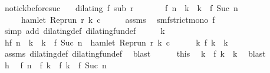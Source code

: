 \begin{isabellebody}
\ no{\isacharunderscore}tick{\isacharunderscore}before{\isacharunderscore}suc{\isacharcolon}\isanewline
\ \ \ {\isacartoucheopen}dilating\ f\ sub\ r{\isacartoucheclose}\isanewline
\ \ \ \ \ \ \ {\isacartoucheopen}{\isacharparenleft}f\ n{\isacharparenright}\ {\isacharless}\ k\ {\isasymand}\ k\ {\isacharless}\ {\isacharparenleft}f\ {\isacharparenleft}Suc\ n{\isacharparenright}{\isacharparenright}{\isacartoucheclose}\isanewline
\ \ \ \ \ {\isacartoucheopen}{\isasymnot}hamlet\ {\isacharparenleft}{\isacharparenleft}Rep{\isacharunderscore}run\ r{\isacharparenright}\ k\ c{\isacharparenright}{\isacartoucheclose}\isanewline
%
\isadelimproof
%
\endisadelimproof
%
\isatagproof
{}\isamarkupfalse%
\ {\isacharminus}\isanewline
\ \ \isamarkupfalse%
\ assms{\isacharparenleft}{}{\isacharparenright}\ \isamarkupfalse%
\ smf{\isacharcolon}{\isacartoucheopen}strict{\isacharunderscore}mono\ f{\isacartoucheclose}\ \isamarkupfalse%
\ {\isacharparenleft}simp\ add{\isacharcolon}\ dilating{\isacharunderscore}def\ dilating{\isacharunderscore}fun{\isacharunderscore}def{\isacharparenright}\isanewline
\ \ \isacommand{{\isacharbraceleft}}\isamarkupfalse%
\ \isamarkupfalse%
\ k\ \isamarkupfalse%
\ h{\isacharcolon}{\isacartoucheopen}f\ n\ {\isacharless}\ k\ {\isasymand}\ k\ {\isacharless}\ f\ {\isacharparenleft}Suc\ n{\isacharparenright}\ {\isasymand}\ hamlet\ {\isacharparenleft}{\isacharparenleft}Rep{\isacharunderscore}run\ r{\isacharparenright}\ k\ c{\isacharparenright}{\isacartoucheclose}\isanewline
\ \ \ \ \isamarkupfalse%
\ {\isacartoucheopen}{\isasymexists}k\ f\ k\ {\isacharequal}\ k{\isacartoucheclose}\ \isamarkupfalse%
\ assms{\isacharparenleft}{}{\isacharparenright}\ dilating{\isacharunderscore}def\ dilating{\isacharunderscore}fun{\isacharunderscore}def\ \isamarkupfalse%
\ blast\isanewline
\ \ \ \ \isamarkupfalse%
\ this\ \isamarkupfalse%
\ k\ \ {\isacartoucheopen}f\ k\ {\isacharequal}\ k{\isacartoucheclose}\ \isamarkupfalse%
\ blast\isanewline
\ \ \ \ \isamarkupfalse%
\ h\ \isamarkupfalse%
\ {\isacartoucheopen}f\ n\ {\isacharless}\ f\ k\ {\isasymand}\ f\ k\ {\isacharless}\ f\ {\isacharparenleft}Suc\ n{\isacharparenright}{\isacartoucheclose}\ \isamarkupfalse%

\end{isabellebody}
